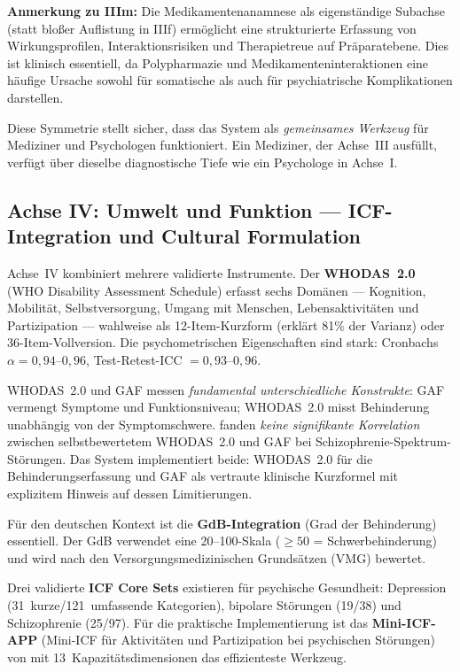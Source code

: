 \documentclass[11pt,a4paper]{article}
\begin{document}
\textbf{Anmerkung zu IIIm:} Die Medikamentenanamnese als eigenst\"andige Subachse (statt blo\ss{}er Auflistung in IIIf) erm\"oglicht eine strukturierte Erfassung von Wirkungsprofilen, Interaktionsrisiken und Therapietreue auf Pr\"aparatebene. Dies ist klinisch essentiell, da Polypharmazie und Medikamenteninteraktionen eine h\"aufige Ursache sowohl f\"ur somatische als auch f\"ur psychiatrische Komplikationen darstellen.

Diese Symmetrie stellt sicher, dass das System als \textit{gemeinsames Werkzeug} f\"ur Mediziner und Psychologen funktioniert. Ein Mediziner, der Achse~III ausf\"ullt, verf\"ugt \"uber dieselbe diagnostische Tiefe wie ein Psychologe in Achse~I.

\subsection{Achse IV: Umwelt und Funktion --- ICF-Integration und Cultural Formulation}
\label{sec:achse4}

Achse~IV kombiniert mehrere validierte Instrumente. Der \textbf{WHODAS~2.0} \citep{WHO2010WHODAS} (WHO Disability Assessment Schedule) erfasst sechs Dom\"anen --- Kognition, Mobilit\"at, Selbstversorgung, Umgang mit Menschen, Lebensaktivit\"aten und Partizipation --- wahlweise als 12-Item-Kurzform (erkl\"art 81\% der Varianz) oder 36-Item-Vollversion. Die psychometrischen Eigenschaften sind stark: Cronbachs $\alpha = 0{,}94$--$0{,}96$, Test-Retest-ICC $= 0{,}93$--$0{,}96$.

WHODAS~2.0 und GAF messen \textit{fundamental unterschiedliche Konstrukte}: GAF vermengt Symptome und Funktionsniveau; WHODAS~2.0 misst Behinderung unabh\"angig von der Symptomschwere. \citet{Gspandl2018WHODAS} fanden \textit{keine signifikante Korrelation} zwischen selbstbewertetem WHODAS~2.0 und GAF bei Schizophrenie-Spektrum-St\"orungen. Das System implementiert beide: WHODAS~2.0 f\"ur die Behinderungserfassung und GAF als vertraute klinische Kurzformel mit explizitem Hinweis auf dessen Limitierungen.

F\"ur den deutschen Kontext ist die \textbf{GdB-Integration} (Grad der Behinderung) essentiell. Der GdB verwendet eine 20--100-Skala ($\geq 50$ = Schwerbehinderung) und wird nach den Versorgungsmedizinischen Grunds\"atzen (VMG) bewertet.

Drei validierte \textbf{ICF Core Sets} existieren f\"ur psychische Gesundheit: Depression (31~kurze/121~umfassende Kategorien), bipolare St\"orungen (19/38) und Schizophrenie (25/97). F\"ur die praktische Implementierung ist das \textbf{Mini-ICF-APP} (Mini-ICF f\"ur Aktivit\"aten und Partizipation bei psychischen St\"orungen) von \citet{LindenBaron2005MiniICF} mit 13~Kapazit\"atsdimensionen das effizienteste Werkzeug.
\end{document}
